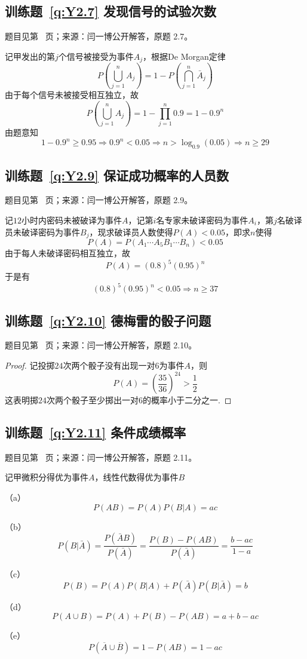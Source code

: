 \subsection*{训练题~\ref{q:Y2.7} 发现信号的试验次数}\label{a:Y2.7}{\small 题目见第~\pageref{q:Y2.7} 页；来源：闫一博公开解答，原题 2.7。}
\begin{solve}
记甲发出的第$j$个信号被接受为事件$A_j$，根据De Morgan定律
\[P(\bigcup\limits_{j = 1}^n {{A_j}} ) = 1 - P(\bigcap\limits_{j = 1}^n {{{\bar A}_j}} )\]
由于每个信号未被接受相互独立，故
\[P(\bigcup\limits_{j = 1}^n {{A_j}} ) = 1 - \prod\limits_{j = 1}^n {0.9}  = 1 - {0.9^n}\]
由题意知
\[1 - {0.9^n} \geqslant 0.95 \Rightarrow {0.9^n} < 0.05 \Rightarrow n > {\log _{0.9}}(0.05) \Rightarrow n \geqslant 29\]
\end{solve}

\subsection*{训练题~\ref{q:Y2.9} 保证成功概率的人员数}\label{a:Y2.9}{\small 题目见第~\pageref{q:Y2.9} 页；来源：闫一博公开解答，原题 2.9。}
\begin{solve}
记$12$小时内密码未被破译为事件$A$，记第$i$名专家未破译密码为事件$A_i$，第$j$名破译员未破译密码为事件$B_j$，现求破译员人数使得$P(A)<0.05$，即求$n$使得
\[P(A) = P({A_1} \cdots {A_5}{B_1} \cdots {B_n}) < 0.05\]
由于每人未破译密码相互独立，故
\[P(A) = {(0.8)^5}{(0.95)^n}\]
于是有
\[{(0.8)^5}{(0.95)^n} < 0.05 \Rightarrow n \geqslant 37\]
\end{solve}

\subsection*{训练题~\ref{q:Y2.10} 德梅雷的骰子问题}\label{a:Y2.10}{\small 题目见第~\pageref{q:Y2.10} 页；来源：闫一博公开解答，原题 2.10。}
\begin{proof}
记投掷$24$次两个骰子没有出现一对$6$为事件$A$，则
\[P(A) = {\left( {\frac{{35}}{{36}}} \right)^{24}} > \frac{1}{2}\]
这表明掷$24$次两个骰子至少掷出一对$6$的概率小于二分之一.
\end{proof}

\subsection*{训练题~\ref{q:Y2.11} 条件成绩概率}\label{a:Y2.11}{\small 题目见第~\pageref{q:Y2.11} 页；来源：闫一博公开解答，原题 2.11。}
\begin{solve}
记甲微积分得优为事件$A$，线性代数得优为事件$B$

（a）
\[P(AB) = P(A)P(B|A) = ac\]

（b）\[P(B|\bar A) = \frac{{P(\bar AB)}}{{P(\bar A)}} = \frac{{P(B) - P(AB)}}{{P(\bar A)}} = \frac{{b - ac}}{{1 - a}}\]

（c）
\[P(B) = P(A)P(B|A) + P(\bar A)P(B|\bar A) = b\]

（d）
\[P(A \cup B) = P(A) + P(B) - P(AB) = a + b - ac\]

（e）
\[P(\overline A  \cup \overline B ) = 1 - P(AB) = 1 - ac\]
\end{solve}

